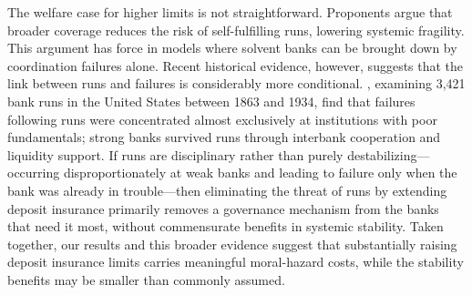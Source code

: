 The welfare case for higher limits is not straightforward.  Proponents argue
that broader coverage reduces the risk of self-fulfilling runs, lowering
systemic fragility.  This argument has force in models where solvent banks can
be brought down by coordination failures alone.  Recent historical evidence,
however, suggests that the link between runs and failures is considerably more
conditional.  \citet{correia2026bank}, examining 3,421 bank runs in the United
States between 1863 and 1934, find that failures following runs were concentrated
almost exclusively at institutions with poor fundamentals; strong banks survived
runs through interbank cooperation and liquidity support.  If runs are
disciplinary rather than purely destabilizing---occurring disproportionately at
weak banks and leading to failure only when the bank was already in trouble---then
eliminating the threat of runs by extending deposit insurance primarily removes
a governance mechanism from the banks that need it most, without commensurate
benefits in systemic stability.  Taken together, our results and this broader
evidence suggest that substantially raising deposit insurance limits carries
meaningful moral-hazard costs, while the stability benefits may be smaller than
commonly assumed.

